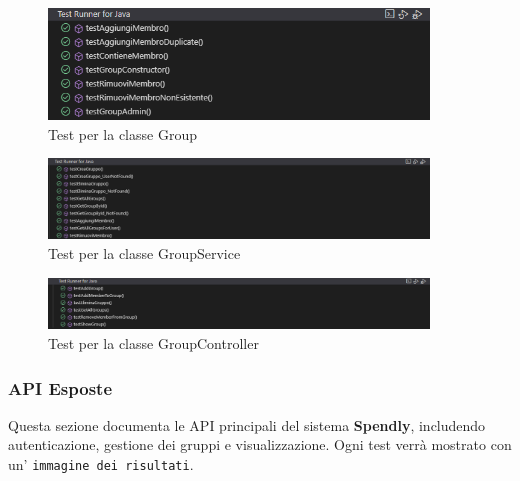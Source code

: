 \begin{figure}[H]
    \centering
    \includegraphics[width=0.9\textwidth]{images/TestGroup.png}
    \caption{Test per la classe Group}
    \label{fig:Group_test}
\end{figure}

\begin{figure}[H]
    \centering
    \includegraphics[width=0.9\textwidth]{images/TestGroupService.png}
    \caption{Test per la classe GroupService}
    \label{fig:GroupService_test}
\end{figure}

\begin{figure}[H]
    \centering
    \includegraphics[width=0.9\textwidth]{images/TestGroupController.png}
    \caption{Test per la classe GroupController}
    \label{fig:GroupController_test}
\end{figure}


\subsubsection{API Esposte}

Questa sezione documenta le API principali del sistema \textbf{Spendly}, includendo autenticazione, gestione dei gruppi e visualizzazione. Ogni test verrà mostrato con un' \texttt{immagine dei risultati}.

